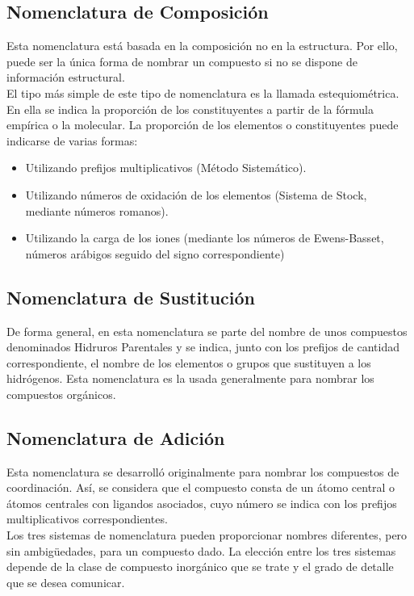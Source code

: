 \subsection{Nomenclatura de Composición}
Esta nomenclatura está basada en la composición no en la estructura. Por ello, puede ser la única forma de nombrar un compuesto si no se dispone de información estructural.\\
El tipo más simple de este tipo de nomenclatura es la llamada estequiométrica. En ella se indica la proporción de los constituyentes a partir de la fórmula empírica o la molecular. La proporción de los elementos o constituyentes puede indicarse de varias formas:\\
\begin{itemize}
	\item Utilizando prefijos multiplicativos (Método Sistemático). 
	\item Utilizando números de oxidación de los elementos (Sistema de Stock, mediante números romanos). 
	\item Utilizando la carga de los iones (mediante los números de Ewens-Basset, números arábigos seguido del signo correspondiente)
\end{itemize}
\subsection{Nomenclatura de Sustitución}
De forma general, en esta nomenclatura se parte del nombre de unos compuestos denominados Hidruros Parentales y se indica, junto con los prefijos de cantidad correspondiente, el nombre de los elementos o grupos que sustituyen a los hidrógenos. Esta nomenclatura es la usada generalmente para nombrar los compuestos orgánicos.
\subsection{Nomenclatura de Adición}
Esta nomenclatura se desarrolló originalmente para nombrar los compuestos de coordinación. Así, se considera que el compuesto consta de un átomo central o átomos centrales con ligandos asociados, cuyo número se indica con los prefijos multiplicativos correspondientes.\\
Los tres sistemas de nomenclatura pueden proporcionar nombres diferentes, pero sin  ambigüedades, para un compuesto dado. La elección entre los tres sistemas depende de la clase de compuesto inorgánico que se trate y el grado de detalle que se desea comunicar.

